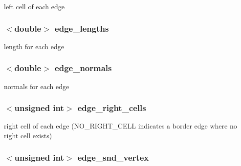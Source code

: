 left cell of each edge 

\hypertarget{classFVL_1_1CFVMesh2D_aebae766e252c936bed264b8ff3c9523d}{
\subsubsection[{edge\_\-lengths}]{$<$double$>$ {\bf edge\_\-lengths}}}
\label{da/d8d/classFVL_1_1CFVMesh2D_aebae766e252c936bed264b8ff3c9523d}


length for each edge 

\hypertarget{classFVL_1_1CFVMesh2D_a42a15adf693b0a6b35f542a7eebd51ed}{
\subsubsection[{edge\_\-normals}]{$<$double$>$ {\bf edge\_\-normals}}}
\label{da/d8d/classFVL_1_1CFVMesh2D_a42a15adf693b0a6b35f542a7eebd51ed}


normals for each edge 

\hypertarget{classFVL_1_1CFVMesh2D_a99a2c529d96512148f33c07cae218825}{
\subsubsection[{edge\_\-right\_\-cells}]{$<$unsigned int$>$ {\bf edge\_\-right\_\-cells}}}
\label{da/d8d/classFVL_1_1CFVMesh2D_a99a2c529d96512148f33c07cae218825}


right cell of each edge (NO\_\-RIGHT\_\-CELL indicates a border edge where no right cell exists) 

\hypertarget{classFVL_1_1CFVMesh2D_a68d5bdf0974c1e9c24b511c6e3801664}{
\subsubsection[{edge\_\-snd\_\-vertex}]{$<$unsigned int$>$ {\bf edge\_\-snd\_\-vertex}}}
\label{da/d8d/classFVL_1_1CFVMesh2D_a68d5bdf0974c1e9c24b511c6e3801664}


